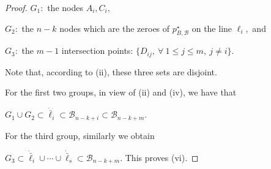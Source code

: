 \documentclass[10pt,a4paper]{amsart}
\newcommand{\Bset}{\mathcal{B}}
\begin{document}
\begin{proof}
$G_1:$ the nodes $A_i, C_i,$ 

$G_2:$ the $n-k$ nodes which are the zeroes of $p^\star_{B,\Bset}$ on the line $\ell_i,$  and 

$G_3:$ the $m-1$ intersection points: $\{D_{ij},\ \forall\ 1\le j\le m,\ j\neq i\}.$

Note that, according to (ii), these three sets are disjoint. 

For the first two groups,  in view of (ii) and (iv), we have that

$G_1\cup G_2\subset \dot{\bar\ell}_i\subset\Bset_{n-k+i}\subset\Bset_{n-k+m}.$

For the third group, similarly we obtain

$G_3\subset\dot{\bar\ell}_i\cup\cdots\cup\dot{\bar\ell}_s\subset\Bset_{n-k+m}.$
This proves (vi).
\end{proof}
\end{document}
